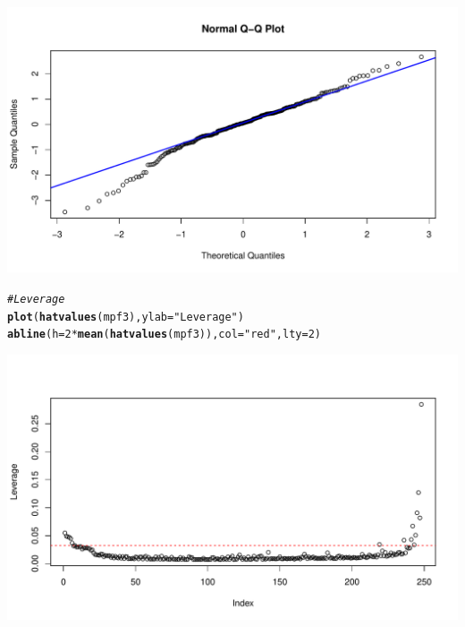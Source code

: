 \documentclass[oneside]{book}\usepackage[]{graphicx}\usepackage[dvipsnames,table,xcdraw]{xcolor}
\makeatletter
\def\maxwidth{ %
  \ifdim\Gin@nat@width>\linewidth
    \linewidth
  \else
    \Gin@nat@width
  \fi
}
\newcommand{\hlnum}[1]{\textcolor[rgb]{0.686,0.059,0.569}{#1}}%
\newcommand{\hlstr}[1]{\textcolor[rgb]{0.192,0.494,0.8}{#1}}%
\newcommand{\hlcom}[1]{\textcolor[rgb]{0.678,0.584,0.686}{\textit{#1}}}%
\newcommand{\hlopt}[1]{\textcolor[rgb]{0,0,0}{#1}}%
\newcommand{\hlstd}[1]{\textcolor[rgb]{0.345,0.345,0.345}{#1}}%
\newcommand{\hlkwc}[1]{\textcolor[rgb]{0.333,0.667,0.333}{#1}}%
\newcommand{\hlkwd}[1]{\textcolor[rgb]{0.737,0.353,0.396}{\textbf{#1}}}%
\newenvironment{kframe}{%
 \def\at@end@of@kframe{}%
 \ifinner\ifhmode%
  \def\at@end@of@kframe{\end{minipage}}%
  \begin{minipage}{\columnwidth}%
 \fi\fi%
 \def\FrameCommand##1{\hskip\@totalleftmargin \hskip-\fboxsep
 \colorbox{shadecolor}{##1}\hskip-\fboxsep
     \hskip-\linewidth \hskip-\@totalleftmargin \hskip\columnwidth}%
 \MakeFramed {\advance\hsize-\width
   \@totalleftmargin\z@ \linewidth\hsize
   \@setminipage}}%
 {\par\unskip\endMakeFramed%
 \at@end@of@kframe}
\newenvironment{knitrout}{}{} %
\makeatother
\begin{document}
\begin{knitrout}
{\centering \includegraphics[width=\maxwidth]{figure/unnamed-chunk-58-2} 

}


\begin{kframe}\begin{alltt}
\hlcom{# Leverage}
\hlkwd{plot}\hlstd{(}\hlkwd{hatvalues}\hlstd{(mpf3),} \hlkwc{ylab} \hlstd{=} \hlstr{"Leverage"}\hlstd{)}
\hlkwd{abline}\hlstd{(}\hlkwc{h} \hlstd{=} \hlnum{2} \hlopt{*} \hlkwd{mean}\hlstd{(}\hlkwd{hatvalues}\hlstd{(mpf3)),} \hlkwc{col} \hlstd{=} \hlstr{"red"}\hlstd{,} \hlkwc{lty} \hlstd{=} \hlnum{2}\hlstd{)}
\end{alltt}
\end{kframe}

{\centering \includegraphics[width=\maxwidth]{figure/unnamed-chunk-58-3} 

}



\end{knitrout}
\end{document}
